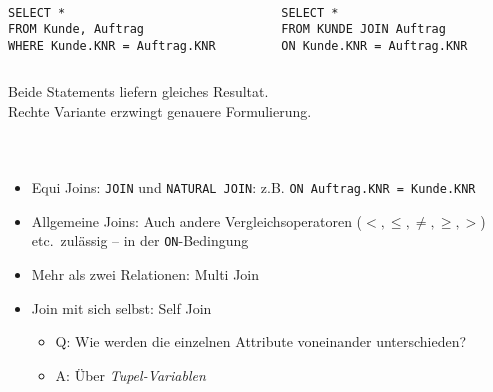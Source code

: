 \begin{frame}[fragile]\frametitle{\insertsection}
\framesubtitle{\insertsubsection}
\\[4pt]
\begin{columns}
\begin{column}{.48\textwidth}
\begin{lstlisting}[xleftmargin=3ex]
SELECT *
FROM Kunde, Auftrag
WHERE Kunde.KNR = Auftrag.KNR
\end{lstlisting}
\end{column}
\begin{column}{.48\textwidth}
\begin{lstlisting}[xleftmargin=3ex]
SELECT *
FROM KUNDE JOIN Auftrag
ON Kunde.KNR = Auftrag.KNR
\end{lstlisting}
\end{column}
\end{columns}
Beide Statements liefern gleiches Resultat.\\
Rechte Variante erzwingt genauere Formulierung.
\end{frame}

\begin{frame}[fragile]\frametitle{\insertsection}
\framesubtitle{\insertsubsection}
\\[4pt]
	\begin{itemize}
		\item Equi Joins: \texttt{JOIN} und \texttt{NATURAL JOIN}: z.B. \texttt{ON Auftrag.KNR = Kunde.KNR}
		\item Allgemeine Joins: Auch andere Vergleichsoperatoren ($<,\leq,\neq,\geq,>$) etc.~zul\"assig -- in der \texttt{ON}-Bedingung
		\item Mehr als zwei Relationen: Multi Join 
		\item Join mit sich selbst: Self Join
		\begin{itemize}
			\item Q: Wie werden die einzelnen Attribute voneinander unterschieden?
			\item A: \"Uber \textit{Tupel-Variablen}
		\end{itemize}
	\end{itemize}
\end{frame}

